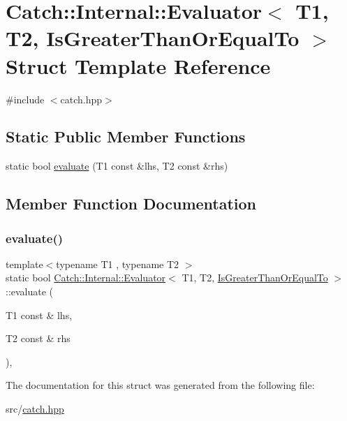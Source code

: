 \hypertarget{struct_catch_1_1_internal_1_1_evaluator_3_01_t1_00_01_t2_00_01_is_greater_than_or_equal_to_01_4}{}\section{Catch\+:\+:Internal\+:\+:Evaluator$<$ T1, T2, Is\+Greater\+Than\+Or\+Equal\+To $>$ Struct Template Reference}
\label{struct_catch_1_1_internal_1_1_evaluator_3_01_t1_00_01_t2_00_01_is_greater_than_or_equal_to_01_4}


{\ttfamily \#include $<$catch.\+hpp$>$}

\subsection*{Static Public Member Functions}
\begin{DoxyCompactItemize}
\item 
static bool \hyperlink{struct_catch_1_1_internal_1_1_evaluator_3_01_t1_00_01_t2_00_01_is_greater_than_or_equal_to_01_4_a5ba107c6da4292b6492a0e5e906f9484}{evaluate} (T1 const \&lhs, T2 const \&rhs)
\end{DoxyCompactItemize}


\subsection{Member Function Documentation}
\mbox{\label{struct_catch_1_1_internal_1_1_evaluator_3_01_t1_00_01_t2_00_01_is_greater_than_or_equal_to_01_4_a5ba107c6da4292b6492a0e5e906f9484}} 
\subsubsection{\texorpdfstring{evaluate()}{evaluate()}}
{\footnotesize\ttfamily template$<$typename T1 , typename T2 $>$ \\
static bool \hyperlink{class_catch_1_1_internal_1_1_evaluator}{Catch\+::\+Internal\+::\+Evaluator}$<$ T1, T2, \hyperlink{namespace_catch_1_1_internal_ae3f96598a7858155750bf38e7295d83ead2de7e9565e59e36c0987e402203ce1c}{Is\+Greater\+Than\+Or\+Equal\+To} $>$\+::evaluate (\begin{DoxyParamCaption}\item[{T1 const \&}]{lhs,  }\item[{T2 const \&}]{rhs }\end{DoxyParamCaption})\hspace{0.3cm}{\ttfamily [inline]}, {\ttfamily [static]}}



The documentation for this struct was generated from the following file\+:\begin{DoxyCompactItemize}
\item 
src/\hyperlink{catch_8hpp}{catch.\+hpp}\end{DoxyCompactItemize}
